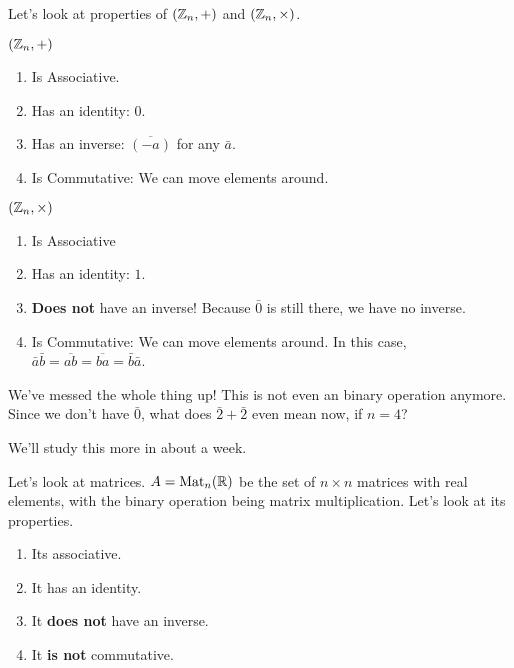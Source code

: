\documentclass[12pt]{article}
\def\mat{\text{Mat}}
\begin{document}

Let's look at properties of $({\mathbb Z}_n, +)$ and $({\mathbb Z}_n, \times)$.

$({\mathbb Z}_n, +)$

\begin{enumerate}
	\item Is Associative.
	\item Has an identity: $0$.
	\item Has an inverse: $\overline{(-a)}$ for any $\bar a$.
	\item Is Commutative: We can move elements around.
\end{enumerate}

$({\mathbb Z}_n, \times)$

\begin{enumerate}
	\item Is Associative
	\item Has an identity: $1$.
	\item {\bf Does not} have an inverse! Because $\bar 0$ is still there, we
	      have no inverse.
	\item Is Commutative: We can move elements around. In this case, $\bar a
		      \bar b = \overline{ab} = \overline{ba} = \bar b \bar a$.
\end{enumerate}

{
	We've messed the whole thing up! This is not even an binary operation
	anymore. Since we don't have $\bar 0$, what does $\bar 2 + \bar 2$ even mean
	now, if $n = 4$?

	We'll study this more in about a week.
}

Let's look at matrices. $A = \mat_n(\R)$ be the set of $n \times n$ matrices
with real elements, with the binary operation being matrix multiplication.
Let's look at its properties.

\begin{enumerate}
	\item Its associative.
	\item It has an identity.
	\item It {\bf does not} have an inverse.
	\item It {\bf is not} commutative.
\end{enumerate}
\end{document}
